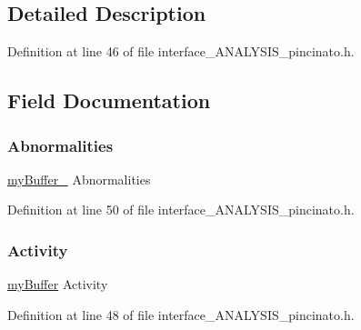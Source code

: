 \subsection{Detailed Description}


Definition at line 46 of file interface\+\_\+\+A\+N\+A\+L\+Y\+S\+I\+S\+\_\+pincinato.\+h.



\subsection{Field Documentation}
\mbox{\label{struct_data_process_______a9d2c0e8b260cec8c51618e7991a2c787}} 
\subsubsection{\texorpdfstring{Abnormalities}{Abnormalities}}
{\footnotesize\ttfamily \mbox{\hyperlink{interface___a_n_a_l_y_s_i_s__pincinato_8h_a02b20b214e8ea5dba5c4b81cd4638fc1}{my\+Buffer\+\_\+}} Abnormalities}



Definition at line 50 of file interface\+\_\+\+A\+N\+A\+L\+Y\+S\+I\+S\+\_\+pincinato.\+h.

\mbox{\label{struct_data_process_______a696c2caf522a9390d98922952a57670f}} 
\subsubsection{\texorpdfstring{Activity}{Activity}}
{\footnotesize\ttfamily \mbox{\hyperlink{interface___a_n_a_l_y_s_i_s__pincinato_8h_a3184f2c2dc500ffc383f0a5e8e7f21f0}{my\+Buffer}} Activity}



Definition at line 48 of file interface\+\_\+\+A\+N\+A\+L\+Y\+S\+I\+S\+\_\+pincinato.\+h.

\mbox{\label{struct_data_process_______af6130eb725e93603b2960dec4d4378ff}} 
